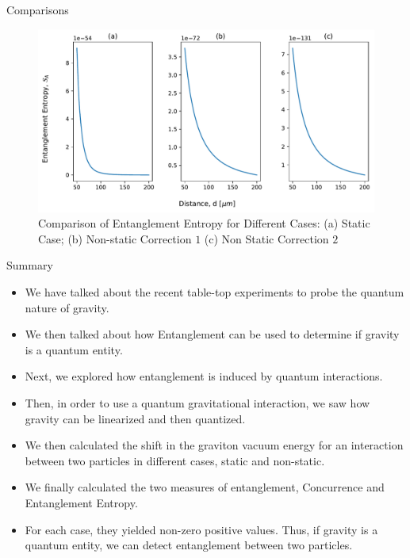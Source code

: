 \documentclass[12pt,aspectratio=1610]{beamer}
\begin{document}
\begin{frame}{Comparisons}
    \begin{figure}
            \centering
            \includegraphics[width=12cm]{EECases.pdf}
            \captionsetup{labelformat=empty}
            \caption{\footnotesize{Comparison of Entanglement Entropy for Different Cases:  (a) Static Case; (b) Non-static Correction $1$ (c) Non Static Correction $2$}}
            \label{fig:EE}
        \end{figure}
\end{frame}

\begin{frame}{Summary}
\begin{itemize}
    \item We have talked about the recent table-top experiments to probe the quantum nature of gravity.
    \item We then talked about how Entanglement can be used to determine if gravity is a quantum entity.
    \item Next, we explored how entanglement is induced by quantum interactions.
    \item Then, in order to use a quantum gravitational interaction, we saw how gravity can be linearized and then quantized.
    \item We then calculated the shift in the graviton vacuum energy for an interaction between two particles in different cases, static and non-static.
    \item We finally calculated the two measures of entanglement, Concurrence and Entanglement Entropy.
    \item For each case, they yielded non-zero positive values. Thus, if gravity is a quantum entity, we can detect entanglement between two particles.
\end{itemize}    
\end{frame}
\end{document}

